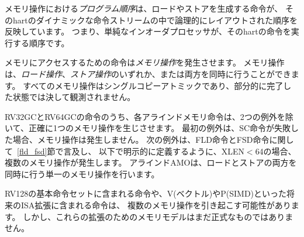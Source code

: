 \label{sec:rvwmo:primitives}
\begin{comment}
The {\em program order} over memory operations reflects the order in which the instructions that generate each load and store are logically laid out in that hart's dynamic instruction stream; i.e., the order in which a simple in-order processor would execute the instructions of that hart.
\end{comment}

メモリ操作における{\em プログラム順序}は、ロードやストアを生成する命令が、
そのhartのダイナミックな命令ストリームの中で論理的にレイアウトされた順序を反映しています。
つまり、単純なインオーダプロセッサが、そのhartの命令を実行する順序です。

\begin{comment}
Memory-accessing instructions give rise to {\em memory operations}.
A memory operation can be either a {\em load operation}, a {\em store operation}, or both simultaneously.
All memory operations are single-copy atomic: they can never be observed in a partially-complete state.
\end{comment}

メモリにアクセスするための命令は{\em メモリ操作}を発生させます。
メモリ操作は、{\em ロード操作}、{\em ストア操作}のいずれか、または両方を同時に行うことができます。
すべてのメモリ操作はシングルコピーアトミックであり、部分的に完了した状態では決して観測されません。

\begin{comment}
Among instructions in RV32GC and RV64GC, each aligned memory instruction gives rise to exactly one memory operation, with two exceptions.
First, an unsuccessful SC instruction does not give rise to any memory operations.
Second, FLD and FSD instructions may each give rise to multiple memory operations if XLEN$<$64, as stated in Section~\ref{fld_fsd} and clarified below.
An aligned AMO gives rise to a single memory operation that is both a load operation and a store operation simultaneously.
\end{comment}

RV32GCとRV64GCの命令のうち、各アラインドメモリ命令は、2つの例外を除いて、正確に1つのメモリ操作を生じさせます。
最初の例外は、SC命令が失敗した場合、メモリ操作は発生しません。
次の例外は、FLD命令とFSD命令に関して~\ref{fld_fsd}節で言及し、
以下で明示的に定義するように、XLEN$<$64の場合、複数のメモリ操作が発生します。
アラインドAMOは、ロードとストアの両方を同時に行う単一のメモリ操作を行います。

\begin{commentary}
\begin{comment}
  Instructions in the RV128 base instruction set and in future ISA extensions such as V (vector) and P (SIMD) may give rise to multiple memory operations.  However, the memory model for these extensions has not yet been formalized.
\end{comment}
  RV128の基本命令セットに含まれる命令や、V(ベクトル)やP(SIMD)といった将来のISA拡張に含まれる命令は、
複数のメモリ操作を引き起こす可能性があります。
しかし、これらの拡張のためのメモリモデルはまだ正式なものではありません。
\end{commentary}

